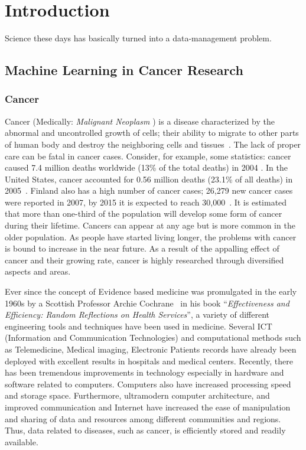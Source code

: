 \chapter{Introduction}
\label{ch:introduction}

\begin{fquote}Science these days has basically turned into a data-management problem.  \end{fquote} 

\section{Machine Learning in Cancer Research}
\label{s:mlinc}

\subsection*{Cancer}
\label{ss:cancer}
Cancer (Medically: \emph {Malignant Neoplasm }) is a disease characterized by the abnormal and uncontrolled growth of cells; their ability to migrate to other parts of human body and destroy the neighboring cells and tissues~\cite{cancer}. The lack of proper care can be fatal in cancer cases. Consider, for example, some statistics: cancer caused 7.4 million deaths worldwide (13\% of the total deaths) in 2004 \cite{whofactsheet}. In the United States, cancer accounted for 0.56 million deaths (23.1\% of all deaths) in 2005~\cite{american}. Finland also has a high number of cancer cases; 26,279 new cancer cases were reported in 2007, by 2015 it is expected to reach 30,000~\cite{finnish}. It is estimated that more than one-third of the population will develop some form of cancer during their lifetime. %
Cancers can appear at any age but is more common in the older population. As people have started living longer, the problems with cancer is bound to increase in the near future. As a result of the appalling effect of cancer and their growing rate, cancer is highly researched through diversified aspects and areas.

Ever since the concept of Evidence based medicine was promulgated in the early 1960s by a Scottish Professor Archie Cochrane~\cite{thatreviewarticle} in his book ``\textit{Effectiveness and Efficiency: Random Reflections on Health Services}'', a variety of different engineering tools and techniques have been used in medicine. Several ICT (Information and Communication Technologies) and computational methods such as Telemedicine, Medical imaging, Electronic Patients records have already been deployed with excellent results in hospitals and medical centers. Recently, there has been tremendous improvements in technology especially in hardware and software related to computers. Computers also have increased processing speed and storage space. Furthermore, ultramodern computer architecture, and improved communication and Internet have increased the ease of manipulation and sharing of data and resources among different communities and regions. Thus, data related to diseases, such as cancer, is efficiently stored and readily available.

